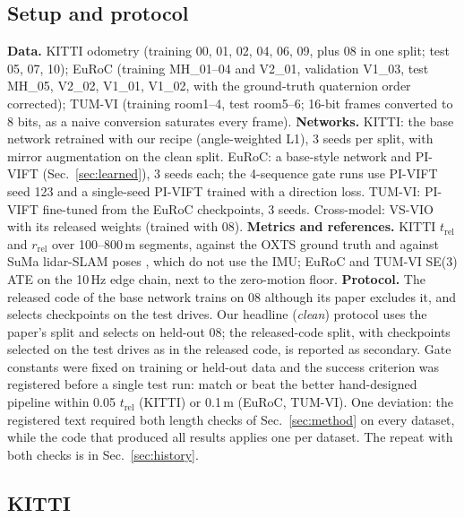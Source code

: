 \documentclass[letterpaper,journal]{IEEEtran}
\begin{document}
\subsection{Setup and protocol}
\textbf{Data.} KITTI odometry \cite{Geiger2012} (training 00, 01, 02, 04, 06, 09, plus 08 in one split; test 05, 07, 10); EuRoC \cite{Burri2016} (training MH\_01--04 and V2\_01, validation V1\_03, test MH\_05, V2\_02, V1\_01, V1\_02, with the ground-truth quaternion order corrected); TUM-VI \cite{Schubert2018} (training room1--4, test room5--6; 16-bit frames converted to 8 bits, as a naive conversion saturates every frame).
\textbf{Networks.} KITTI: the base network retrained with our recipe (angle-weighted L1), 3 seeds per split, with mirror augmentation on the clean split. EuRoC: a base-style network and PI-VIFT (Sec.~\ref{sec:learned}), 3 seeds each; the 4-sequence gate runs use PI-VIFT seed 123 and a single-seed PI-VIFT trained with a direction loss. TUM-VI: PI-VIFT fine-tuned from the EuRoC checkpoints, 3 seeds. Cross-model: VS-VIO \cite{Yang2022} with its released weights (trained with 08).
\textbf{Metrics and references.} KITTI $t_\mathrm{rel}$ and $r_\mathrm{rel}$ over 100--800\,m segments, against the OXTS ground truth and against SuMa lidar-SLAM poses \cite{Behley2018}, which do not use the IMU; EuRoC and TUM-VI SE(3) ATE on the 10\,Hz edge chain, next to the zero-motion floor.
\textbf{Protocol.} The released code of the base network trains on 08 although its paper excludes it, and selects checkpoints on the test drives. Our headline (\emph{clean}) protocol uses the paper's split and selects on held-out 08; the released-code split, with checkpoints selected on the test drives as in the released code, is reported as secondary. Gate constants were fixed on training or held-out data and the success criterion was registered before a single test run: match or beat the better hand-designed pipeline within 0.05 $t_\mathrm{rel}$ (KITTI) or 0.1\,m (EuRoC, TUM-VI). One deviation: the registered text required both length checks of Sec.~\ref{sec:method} on every dataset, while the code that produced all results applies one per dataset. The repeat with both checks is in Sec.~\ref{sec:history}.

\subsection{KITTI}
\end{document}
